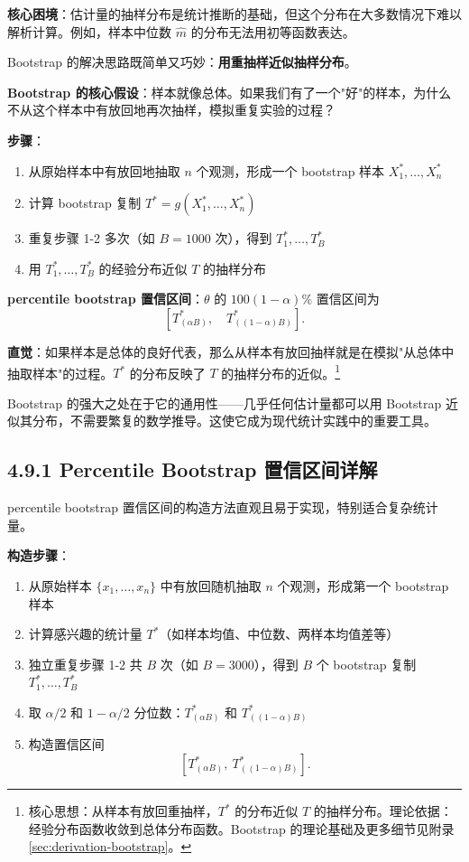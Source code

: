 \textbf{核心困境}：估计量的抽样分布是统计推断的基础，但这个分布在大多数情况下难以解析计算。例如，样本中位数 $\widehat{m}$ 的分布无法用初等函数表达。

Bootstrap 的解决思路既简单又巧妙：\textbf{用重抽样近似抽样分布}。

\textbf{Bootstrap 的核心假设}：样本就像总体。如果我们有了一个"好"的样本，为什么不从这个样本中有放回地再次抽样，模拟重复实验的过程？

\textbf{步骤}：
\begin{enumerate}
\item 从原始样本中有放回地抽取 $n$ 个观测，形成一个 bootstrap 样本 $X_1^*, \ldots, X_n^*$
\item 计算 bootstrap 复制 $T^* = g(X_1^*, \ldots, X_n^*)$
\item 重复步骤 1-2 多次（如 $B = 1000$ 次），得到 $T_1^*, \ldots, T_B^*$
\item 用 $T_1^*, \ldots, T_B^*$ 的经验分布近似 $T$ 的抽样分布
\end{enumerate}

\textbf{percentile bootstrap 置信区间}：$\theta$ 的 $100(1-\alpha)\%$ 置信区间为
\[
\left[ T_{(\alpha B)}^*,\quad T_{((1-\alpha)B)}^* \right].
\label{eq:bootstrap-ci}\]

\textbf{直觉}：如果样本是总体的良好代表，那么从样本有放回抽样就是在模拟"从总体中抽取样本"的过程。$T^*$ 的分布反映了 $T$ 的抽样分布的近似。\footnote{核心思想：从样本有放回重抽样，$T^*$ 的分布近似 $T$ 的抽样分布。理论依据：经验分布函数收敛到总体分布函数。Bootstrap 的理论基础及更多细节见附录 \cref{sec:derivation-bootstrap}。}

Bootstrap 的强大之处在于它的通用性——几乎任何估计量都可以用 Bootstrap 近似其分布，不需要繁复的数学推导。这使它成为现代统计实践中的重要工具。

\subsection{4.9.1 Percentile Bootstrap 置信区间详解}\label{sec:4.9.1}

 percentile bootstrap 置信区间的构造方法直观且易于实现，特别适合复杂统计量。

\textbf{构造步骤}：
\begin{enumerate}
\item 从原始样本 $\{x_1, \ldots, x_n\}$ 中有放回随机抽取 $n$ 个观测，形成第一个 bootstrap 样本
\item 计算感兴趣的统计量 $T^*$（如样本均值、中位数、两样本均值差等）
\item 独立重复步骤 1-2 共 $B$ 次（如 $B=3000$），得到 $B$ 个 bootstrap 复制 $T_1^*, \ldots, T_B^*$
\item 取 $\alpha/2$ 和 $1-\alpha/2$ 分位数：$T_{(\alpha B)}^*$ 和 $T_{((1-\alpha)B)}^*$
\item 构造置信区间
\[
\left[T_{(\alpha B)}^*,\ T_{((1-\alpha)B)}^*\right].
\label{eq:percentile-bootstrap-ci}
\]
\end{enumerate}

